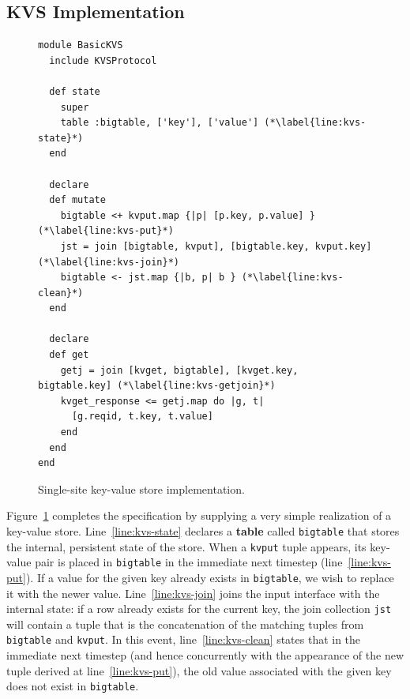 \subsection{KVS Implementation}
\begin{figure}[t]
\begin{scriptsize}
\begin{lstlisting}
module BasicKVS
  include KVSProtocol

  def state
    super
    table :bigtable, ['key'], ['value'] (*\label{line:kvs-state}*)
  end

  declare
  def mutate
    bigtable <+ kvput.map {|p| [p.key, p.value] } (*\label{line:kvs-put}*)
    jst = join [bigtable, kvput], [bigtable.key, kvput.key] (*\label{line:kvs-join}*)
    bigtable <- jst.map {|b, p| b } (*\label{line:kvs-clean}*)
  end

  declare
  def get
    getj = join [kvget, bigtable], [kvget.key, bigtable.key] (*\label{line:kvs-getjoin}*)
    kvget_response <= getj.map do |g, t|
      [g.reqid, t.key, t.value]
    end
  end
end
\end{lstlisting}
\centering
\vspace{-10pt}
\caption{Single-site key-value store implementation.}
\label{fig:kvs-impl}
\end{scriptsize}
\vspace{-2pt}
\end{figure}

Figure~\ref{fig:kvs-impl} completes the specification by supplying a very simple
realization of a key-value store.  Line~\ref{line:kvs-state} declares a \textbf{table}
called \texttt{bigtable} that stores the internal, persistent state of the store.
When a \texttt{kvput} tuple appears, its key-value pair is placed in \texttt{bigtable} in the
immediate next timestep (line~\ref{line:kvs-put}).  If a value for the given key already 
exists in \texttt{bigtable}, we wish to replace it with the newer value.  Line~\ref{line:kvs-join}
joins the input interface with the internal state: if a row already exists for the current key,  
the join collection \texttt{jst} will contain a tuple that is the concatenation of the matching
tuples from \texttt{bigtable} and \texttt{kvput}.  In this event, line~\ref{line:kvs-clean}
states that in the immediate next timestep (and hence concurrently with the appearance of the
new tuple derived at line~\ref{line:kvs-put}), the old value associated with the given key
does not exist in \texttt{bigtable}.  


